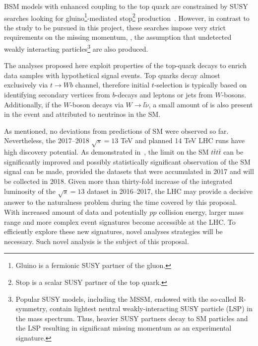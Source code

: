 \textcolor{\mycolor}{
BSM models with enhanced coupling to the top quark are constrained by SUSY searches looking for gluino\footnote{Gluino is a fermionic SUSY partner of the gluon.}-mediated stop\footnote{Stop is a scalar SUSY partner of the top quark.} production~\cite{Sirunyan:2017uyt}. However, in contrast to the study to be pursued in this project, these searches impose very strict requirements on the missing momentum, \misspt, the assumption that undetected weakly interacting particles\footnote{Popular SUSY models, including the MSSM, endowed with the so-called R-symmetry, contain lightest neutral weakly-interacting SUSY particle (LSP) in the mass spectrum. Thus, heavier SUSY partners decay to SM particles and the LSP resulting in significant missing momentum as an experimental signature.} are also produced.}

\textcolor{\mycolor}{
The analyses proposed here exploit properties of the top-quark decays to enrich data samples with hypothetical signal events. Top quarks decay almost exclusively via $t \rightarrow Wb$ channel, therefore initial $t$-selection is typically based on identifying secondary vertices from $b$-decays and leptons or jets from $W$-bosons. Additionally, if the $W$-boson decays via $W\rightarrow l\tilde{\nu}$, a small amount of \misspt is also present in the event and attributed to neutrinos in the SM. }

\textcolor{\mycolor}{
As mentioned, no deviations from predictions of SM were observed so far. Nevertheless, the 2017--2018 $\sqrt{s}=13$ TeV and planned 14 TeV LHC runs have high discovery potential. As demonstrated in~\cite{Sirunyan:2017tep}, the limit on the SM $t\bar{t}t\bar{t}$ can be significantly improved and possibly statistically significant observation of the SM signal can be made, provided the datasets that were accumulated in 2017 and will be collected in 2018. 
Given more than thirty-fold increase of the integrated luminosity of the $\sqrt{s}=13$ dataset in 2016--2017, the LHC may provide a decisive answer to the naturalness problem during the time covered by this proposal. With increased amount of data and potentially $pp$ collision energy, larger mass range and more complex event signatures become accessible at the LHC. To efficiently explore these new signatures, novel analyses strategies will be necessary. Such novel analysis is the subject of this proposal.}

